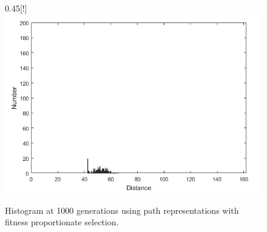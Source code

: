 \begin{figure}{0.45\textwidth}[!]
\centering
 \includegraphics[width=1\textwidth]{../figures/question_5/FPS_hist.png}
 \caption{Histogram at 1000 generations using path representations with fitness proportionate selection.}
 \label{fig:fps_hist}
\end{figure}

